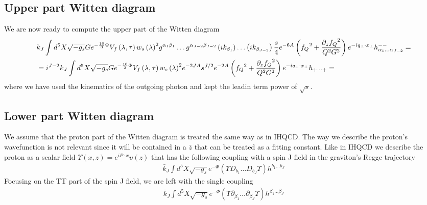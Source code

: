 \documentclass[a4paper,12pt]{article}
\begin{document}
\subsection{Upper part Witten diagram}
We are now ready to compute the upper part of the Witten diagram
\begin{align}
&k_J \int d^5X \sqrt{-g_s} G e^{-\frac{10}{3}\Phi} V_f \left( \lambda, \tau \right) {w_s\left(\lambda \right)}^2 g^{\alpha_1 \beta_1} \dots g^{\alpha_{J-2} \beta_{J-2}} \left( i k_{\beta_1}\right) \dots  \left( i k_{\beta_{J-2}}\right)  \frac{s}{4} e^{-6A} \left(  {f_Q}^2 + \frac{{\partial_z f_Q}^2}{Q^2 G^2}  \right) e^{-i q_\perp \cdot x_\perp} h^{--}_{\alpha_1 \dots \alpha_{J-2}} = \notag \\
& = i^{J-2} k_J \int d^5X \sqrt{-g_s} G e^{-\frac{10}{3}\Phi} V_f \left( \lambda, \tau \right) {w_s\left(\lambda \right)}^2 e^{-2 J A}  s^{J/2} e^{-2A} \left(  {f_Q}^2 + \frac{{\partial_z f_Q}^2}{Q^2 G^2}  \right) e^{-i q_\perp \cdot x_\perp} h_{+ \dots +} =
\end{align}
where we have used the kinematics of the outgoing photon and kept the leadin term power of $\sqrt{s}$.
\subsection{Lower part Witten diagram}
We assume that the proton part of the Witten diagram is treated the same way as in IHQCD. The way we describe the proton's wavefunction is not relevant since it will be contained in a $\bar{z}$ that can be treated as a fitting constant. Like in IHQCD we describe the proton as a scalar field $\Upsilon\left(x, z\right) = e^{i P \cdot x} \upsilon\left(z\right)$ that has the following coupling with a spin J field in the graviton's Regge trajectory
\begin{align}
\bar{k}_J \int d^5 X \sqrt{-g_s} e^{-\Phi} \left( \Upsilon D_{b_1} \dots D_{b_J} \Upsilon \right) h^{b_1 \dots b_J}
\end{align}
Focusing on the TT part of the spin J field, we are left with the single coupling
\begin{align}
\bar{k}_J \int d^5 X \sqrt{-g_s} e^{-\Phi} \left( \Upsilon \partial_{\beta_1} \dots \partial_{\beta_J} \Upsilon \right) h^{\beta_1 \dots \beta_J}
\end{align}
\end{document}

